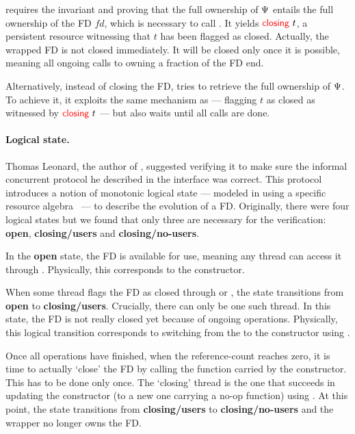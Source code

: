  requires the invariant and proving that the full ownership of $\Psi$ entails the full ownership of the FD $\mathit{fd}$, which is necessary to call .
It yields $\textcolor{red}{\textsf{\upshape closing}}\ t$, a persistent resource witnessing that $t$ has been flagged as closed.
Actually, the wrapped FD is not closed immediately.
It will be closed only once it is possible, meaning all ongoing calls to  owning a fraction of the FD end.

Alternatively, instead of closing the FD,  tries to retrieve the full ownership of $\Psi$.
To achieve it, it exploits the same mechanism as  --- flagging $t$ as closed as witnessed by $\textcolor{red}{\textsf{\upshape closing}}\ t$ --- but also waits until all  calls are done.

\paragraph{Logical state.}
Thomas Leonard, the author of , suggested verifying it to make sure the informal concurrent protocol he described in the \OCaml interface was correct.
This protocol introduces a notion of monotonic logical state --- modeled in \Iris using a specific resource algebra~\cite{DBLP:conf/cpp/TimanyB21} --- to describe the evolution of a FD.
Originally, there were four logical states but we found that only three are necessary for the verification: \textbf{open}, \textbf{closing/users} and \textbf{closing/no-users}.

In the \textbf{open} state, the FD is available for use, meaning any thread can access it through .
Physically, this corresponds to the  constructor.

When some thread flags the FD as closed through  or , the state transitions from \textbf{open} to \textbf{closing/users}.
Crucially, there can only be one such thread.
In this state, the FD is not really closed yet because of ongoing  operations.
Physically, this logical transition corresponds to switching from the  to the  constructor using .

Once all  operations have finished, when the reference-count reaches zero, it is time to actually `close' the FD by calling the function carried by the  constructor.
This has to be done only once.
The `closing' thread is the one that succeeds in updating the  constructor (to a new one carrying a no-op function) using .
At this point, the state transitions from \textbf{closing/users} to \textbf{closing/no-users} and the wrapper no longer owns the FD.

